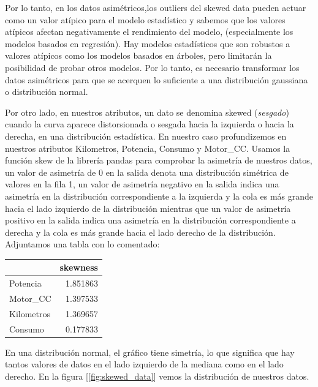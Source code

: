 \documentclass[12pt,twoside]{report}
\begin{document}
Por lo tanto, en los datos asimétricos,los outliers del skewed data pueden actuar como un valor atípico para el modelo estadístico y sabemos que los valores atípicos afectan negativamente el rendimiento del modelo, (especialmente los modelos basados en regresión). Hay modelos estadísticos que son robustos a valores atípicos como los modelos basados en árboles, pero limitarán la posibilidad de probar otros modelos. Por lo tanto, es necesario transformar los datos asimétricos para que se acerquen lo suficiente a una distribución gaussiana o distribución normal. 


Por otro lado, en nuestros atributos, un dato se denomina skewed (\textit{sesgado}) cuando la curva aparece distorsionada o sesgada hacia la izquierda o hacia la derecha, en una distribución estadística. En nuestro caso profundizemos en nuestros atributos Kilometros, Potencia, Consumo y Motor\_CC. Usamos la función skew \cite{skew} de la librería pandas para comprobar la asimetría de nuestros datos, un valor de asimetría de 0 en la salida denota una distribución simétrica de valores en la fila 1, un valor de asimetría negativo en la salida indica una asimetría en la distribución correspondiente a la izquierda y la cola es más grande hacia el lado izquierdo de la distribución mientras que un valor de asimetría positivo en la salida indica una asimetría en la distribución correspondiente a derecha y la cola es más grande hacia el lado derecho de la distribución. Adjuntamos una tabla con lo comentado:

\begin{center}
\begin{tabular}{lr}
\toprule{} &  skewness \\
\midrule Potencia   &  1.851863 \\
Motor\_CC   &  1.397533 \\
Kilometros &  1.369657 \\
Consumo    &  0.177833 \\
\bottomrule
\end{tabular}
\end{center}

En una distribución normal, el gráfico tiene simetría, lo que significa que hay tantos valores de datos en el lado izquierdo de la mediana como en el lado derecho. En la figura [\ref{fig:skewed_data}] vemos la distribución de nuestros datos.
\end{document}
